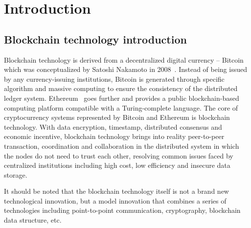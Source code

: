 \section{Introduction}

\subsection{Blockchain technology introduction}
Blockchain technology is derived from a decentralized digital currency – Bitcoin which was conceptualized by Satoshi Nakamoto in 2008~\cite{Nakamoto2008}. Instead of being issued by any currency-issuing institutions, Bitcoin is generated through specific algorithm and massive computing to ensure the consistency of the distributed ledger system. Ethereum~\cite{buterin2014ethereum} goes further and provides a public blockchain-based computing platform compatible with a Turing-complete language. The core of cryptocurrency systems represented by Bitcoin and Ethereum is blockchain technology. With data encryption, timestamp, distributed consensus and economic incentive, blockchain technology brings into reality peer-to-peer transaction, coordination and collaboration in the distributed system in which the nodes do not need to trust each other, resolving common issues faced by centralized institutions including high cost, low efficiency and insecure data storage.

It should be noted that the blockchain technology itself is not a brand new technological innovation, but a model innovation that combines a series of technologies including point-to-point communication, cryptography, blockchain data structure, etc.

